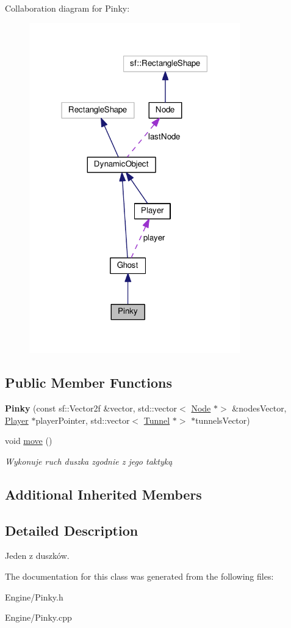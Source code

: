 Collaboration diagram for Pinky\+:\nopagebreak
\begin{figure}[H]
\begin{center}
\leavevmode
\includegraphics[width=259pt]{classPinky__coll__graph}
\end{center}
\end{figure}
\subsection*{Public Member Functions}
\begin{DoxyCompactItemize}
\item 
\mbox{\label{classPinky_a6f64c92d7359c3d7694a9d6e5d73c1a9}} 
{\bfseries Pinky} (const sf\+::\+Vector2f \&vector, std\+::vector$<$ \hyperlink{classNode}{Node} $\ast$$>$ \&nodes\+Vector, \hyperlink{classPlayer}{Player} $\ast$player\+Pointer, std\+::vector$<$ \hyperlink{classTunnel}{Tunnel} $\ast$$>$ $\ast$tunnels\+Vector)
\item 
\mbox{\label{classPinky_afaa17045a3d876bafecc3f77bbc295ff}} 
void \hyperlink{classPinky_afaa17045a3d876bafecc3f77bbc295ff}{move} ()
\begin{DoxyCompactList}\small\item\em Wykonuje ruch duszka zgodnie z jego taktyką \end{DoxyCompactList}\end{DoxyCompactItemize}
\subsection*{Additional Inherited Members}


\subsection{Detailed Description}
Jeden z duszków. 

The documentation for this class was generated from the following files\+:\begin{DoxyCompactItemize}
\item 
Engine/Pinky.\+h\item 
Engine/Pinky.\+cpp\end{DoxyCompactItemize}
